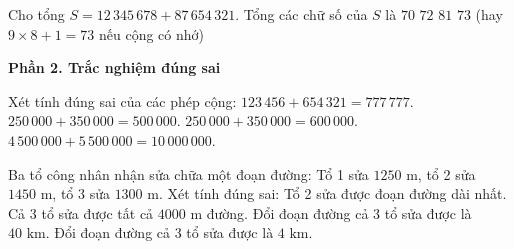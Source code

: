 \begin{ex} %
Cho tổng $S = 12\,345\,678 + 87\,654\,321$. Tổng các chữ số của $S$ là
\choice
{$70$}
{$72$}
{$81$}
{\True $73$ (hay $9 \times 8 + 1 = 73$ nếu cộng có nhớ)}
\end{ex}

\textbf{Phần 2. Trắc nghiệm đúng sai}

\begin{ex} %
Xét tính đúng sai của các phép cộng:
\choiceTF
{\True $123\,456 + 654\,321 = 777\,777$.}
{$250\,000 + 350\,000 = 500\,000$.}
{\True $250\,000 + 350\,000 = 600\,000$.}
{\True $4\,500\,000 + 5\,500\,000 = 10\,000\,000$.}
\end{ex}

\begin{ex} %
Ba tổ công nhân nhận sửa chữa một đoạn đường: Tổ 1 sửa $1250\text{ m}$, tổ 2 sửa $1450\text{ m}$, tổ 3 sửa $1300\text{ m}$. Xét tính đúng sai:
\choiceTF
{\True Tổ 2 sửa được đoạn đường dài nhất.}
{\True Cả 3 tổ sửa được tất cả $4000\text{ m}$ đường.}
{Đổi đoạn đường cả 3 tổ sửa được là $40\text{ km}$.}
{\True Đổi đoạn đường cả 3 tổ sửa được là $4\text{ km}$.}
\end{ex}

